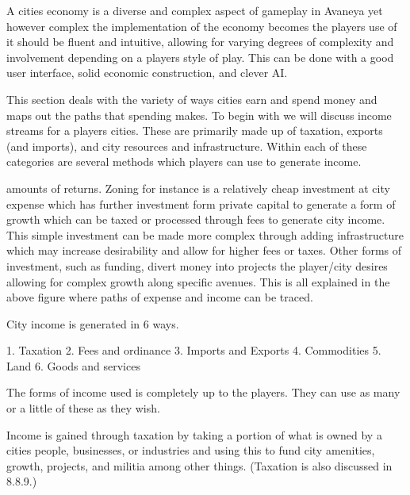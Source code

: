 


A cities economy is a diverse and complex aspect of gameplay in Avaneya yet however complex the implementation of the economy becomes the players use of it should be fluent and intuitive, allowing for varying degrees of complexity and involvement depending on a players style of play. This can be done with a good user interface, solid economic construction, and clever AI. 

This section deals with the variety of ways cities earn and spend money and maps out the paths that spending makes. To begin with we will discuss income streams for a players cities. These are primarily made up of taxation, exports (and imports), and city resources and infrastructure. Within each of these categories are several methods which players can use to generate income.


amounts of returns. Zoning for instance is a relatively cheap investment at city expense which has further investment form private capital to generate a form of growth which can be taxed or processed through fees to generate city income. This simple investment can be made more complex through adding infrastructure which may increase desirability and allow for higher fees or taxes. Other forms of investment, such as funding, divert money into projects the player/city desires allowing for complex growth along specific avenues. This is all explained in the above figure where paths of expense and income can be traced.





City income is generated in 6 ways.

1.  Taxation
2.  Fees and ordinance
3.  Imports and Exports
4.  Commodities
5.  Land
6.  Goods and services

The forms of income used is completely up to the players. They can use as many or a little of these as they wish.

Income is gained through taxation by taking a portion of what is owned by a cities people, businesses, or industries and using this to fund city amenities, growth, projects, and militia among other things. (Taxation is also discussed in 8.8.9.)

